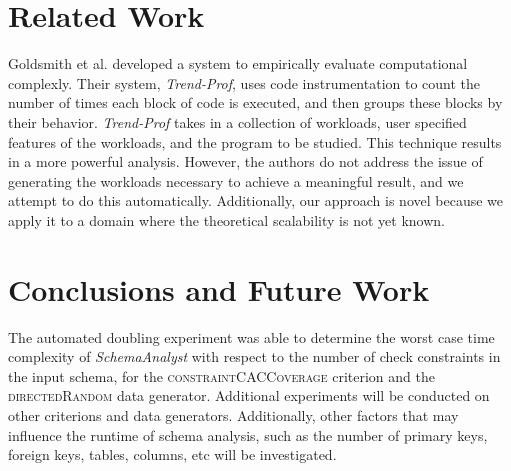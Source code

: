 \documentclass[smallextended]{svjour3}       %
\begin{document}
\section{Related Work}
  Goldsmith et al. developed a system to empirically evaluate
  computational complexly.  Their system, \textit{Trend-Prof},
  uses code instrumentation to
  count the number of times each block of code is executed, and then
  groups these blocks by their behavior.  \textit{Trend-Prof} takes in a
  collection of workloads, user specified features of the workloads, and
  the program to be studied. This technique results in a more powerful
  analysis. However, the authors do not address the
  issue of generating the workloads necessary to achieve a meaningful
  result, and we attempt to do this automatically.  Additionally, our
  approach is novel because we apply it to a domain where the
  theoretical scalability is not yet known.
  \cite{Goldsmith:2007:MEC:1287624.1287681}

\section{Conclusions and Future Work}
The automated doubling experiment was able to determine the worst case
time complexity of \textit{SchemaAnalyst} with respect to the number of
check constraints in the input schema, for the
\textsc{constraintCACCoverage} criterion and the
\textsc{directedRandom} data generator.  Additional experiments will be
conducted on other criterions and data generators. Additionally, other factors 
that may influence the runtime of schema analysis,
such as the number of primary keys, foreign keys, tables, columns, etc
will be investigated.


\end{document}
